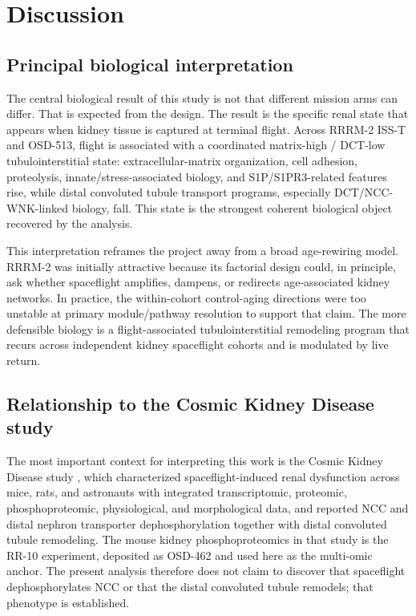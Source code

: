 \documentclass[11pt]{article}
\begin{document}
\section{Discussion}

\subsection{Principal biological interpretation}

The central biological result of this study is not that different mission arms can differ. That is expected from the design. The result is the specific renal state that appears when kidney tissue is captured at terminal flight. Across RRRM-2 ISS-T and OSD-513, flight is associated with a coordinated matrix-high / DCT-low tubulointerstitial state: extracellular-matrix organization, cell adhesion, proteolysis, innate/stress-associated biology, and S1P/S1PR3-related features rise, while distal convoluted tubule transport programs, especially DCT/NCC-WNK-linked biology, fall. This state is the strongest coherent biological object recovered by the analysis.

This interpretation reframes the project away from a broad age-rewiring model. RRRM-2 was initially attractive because its factorial design could, in principle, ask whether spaceflight amplifies, dampens, or redirects age-associated kidney networks. In practice, the within-cohort control-aging directions were too unstable at primary module/pathway resolution to support that claim. The more defensible biology is a flight-associated tubulointerstitial remodeling program that recurs across independent kidney spaceflight cohorts and is modulated by live return.

\subsection{Relationship to the Cosmic Kidney Disease study}

The most important context for interpreting this work is the Cosmic Kidney Disease study \citep{siew2024cosmic}, which characterized spaceflight-induced renal dysfunction across mice, rats, and astronauts with integrated transcriptomic, proteomic, phosphoproteomic, physiological, and morphological data, and reported NCC and distal nephron transporter dephosphorylation together with distal convoluted tubule remodeling. The mouse kidney phosphoproteomics in that study is the RR-10 experiment, deposited as OSD-462 and used here as the multi-omic anchor. The present analysis therefore does not claim to discover that spaceflight dephosphorylates NCC or that the distal convoluted tubule remodels; that phenotype is established.
\end{document}
